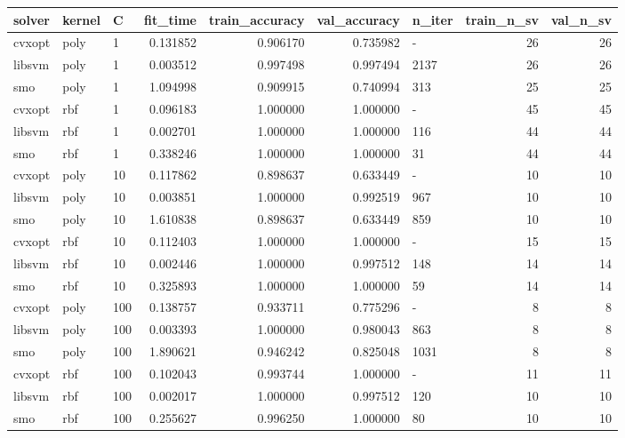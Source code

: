 \begin{tabular}{lllrrrlrr}
\toprule
solver & kernel &   C &  fit\_time &  train\_accuracy &  val\_accuracy & n\_iter &  train\_n\_sv &  val\_n\_sv \\
\midrule
cvxopt &   poly &   1 &  0.131852 &        0.906170 &      0.735982 &      - &          26 &        26 \\
libsvm &   poly &   1 &  0.003512 &        0.997498 &      0.997494 &   2137 &          26 &        26 \\
   smo &   poly &   1 &  1.094998 &        0.909915 &      0.740994 &    313 &          25 &        25 \\
cvxopt &    rbf &   1 &  0.096183 &        1.000000 &      1.000000 &      - &          45 &        45 \\
libsvm &    rbf &   1 &  0.002701 &        1.000000 &      1.000000 &    116 &          44 &        44 \\
   smo &    rbf &   1 &  0.338246 &        1.000000 &      1.000000 &     31 &          44 &        44 \\
cvxopt &   poly &  10 &  0.117862 &        0.898637 &      0.633449 &      - &          10 &        10 \\
libsvm &   poly &  10 &  0.003851 &        1.000000 &      0.992519 &    967 &          10 &        10 \\
   smo &   poly &  10 &  1.610838 &        0.898637 &      0.633449 &    859 &          10 &        10 \\
cvxopt &    rbf &  10 &  0.112403 &        1.000000 &      1.000000 &      - &          15 &        15 \\
libsvm &    rbf &  10 &  0.002446 &        1.000000 &      0.997512 &    148 &          14 &        14 \\
   smo &    rbf &  10 &  0.325893 &        1.000000 &      1.000000 &     59 &          14 &        14 \\
cvxopt &   poly & 100 &  0.138757 &        0.933711 &      0.775296 &      - &           8 &         8 \\
libsvm &   poly & 100 &  0.003393 &        1.000000 &      0.980043 &    863 &           8 &         8 \\
   smo &   poly & 100 &  1.890621 &        0.946242 &      0.825048 &   1031 &           8 &         8 \\
cvxopt &    rbf & 100 &  0.102043 &        0.993744 &      1.000000 &      - &          11 &        11 \\
libsvm &    rbf & 100 &  0.002017 &        1.000000 &      0.997512 &    120 &          10 &        10 \\
   smo &    rbf & 100 &  0.255627 &        0.996250 &      1.000000 &     80 &          10 &        10 \\
\bottomrule
\end{tabular}
